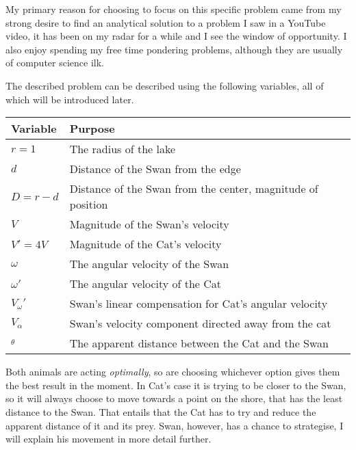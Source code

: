 \documentclass[12pt]{article}
\begin{document}
My primary reason for choosing to focus on this specific problem came from my strong desire to find an analytical solution to a problem I saw in a YouTube video\cite{Catandmouse}, it has been on my radar for a while and I see the window of opportunity. I also enjoy spending my free time pondering problems, although they are usually of computer science ilk.  

The described problem can be described using the following variables, all of which will be introduced later.

\begin{tabular}{|l|l|}
\hline
\textbf{Variable} & \textbf{Purpose}\\
\hline
$r = 1$ & The radius of the lake\\
$d$ & Distance of the Swan from the edge\\
$D = r - d$ & Distance of the Swan from the center, magnitude of position\\
$V$ & Magnitude of the Swan's velocity\\
$V' = 4V$ & Magnitude of the Cat's velocity\\
$\omega$ & The angular velocity of the Swan\\
$\omega'$ & The angular velocity of the Cat\\
$V_\omega'$ & Swan's linear compensation for Cat's angular velocity\\
$V_\alpha$ & Swan's velocity component directed away from the cat\\
$_\theta$ & The apparent distance between the Cat and the Swan\\
\hline
\end{tabular}
\vspace{12pt}

Both animals are acting \textit{optimally}, so are choosing whichever option gives them the best result in the moment. In Cat's case it is trying to be closer to the Swan, so it will always choose to move towards a point on the shore, that has the least distance to the Swan. That entails that the Cat has to try and reduce the apparent distance of it and its prey. Swan, however, has a chance to strategise, I will explain his movement in more detail further.

\begin{center}
\end{center}
\end{document}
